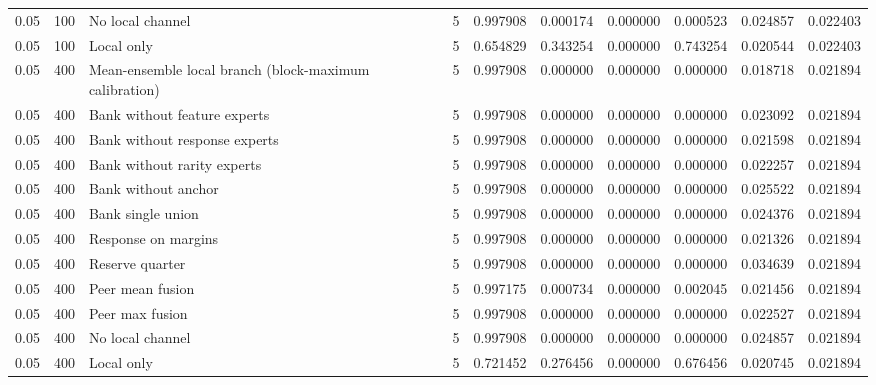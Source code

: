 \begin{tabular}{llllllllll}
0.05 & 100 & No local channel & 5 & 0.997908 & 0.000174 & 0.000000 & 0.000523 & 0.024857 & 0.022403 \\
0.05 & 100 & Local only & 5 & 0.654829 & 0.343254 & 0.000000 & 0.743254 & 0.020544 & 0.022403 \\
0.05 & 400 & Mean-ensemble local branch (block-maximum calibration) & 5 & 0.997908 & 0.000000 & 0.000000 & 0.000000 & 0.018718 & 0.021894 \\
0.05 & 400 & Bank without feature experts & 5 & 0.997908 & 0.000000 & 0.000000 & 0.000000 & 0.023092 & 0.021894 \\
0.05 & 400 & Bank without response experts & 5 & 0.997908 & 0.000000 & 0.000000 & 0.000000 & 0.021598 & 0.021894 \\
0.05 & 400 & Bank without rarity experts & 5 & 0.997908 & 0.000000 & 0.000000 & 0.000000 & 0.022257 & 0.021894 \\
0.05 & 400 & Bank without anchor & 5 & 0.997908 & 0.000000 & 0.000000 & 0.000000 & 0.025522 & 0.021894 \\
0.05 & 400 & Bank single union & 5 & 0.997908 & 0.000000 & 0.000000 & 0.000000 & 0.024376 & 0.021894 \\
0.05 & 400 & Response on margins & 5 & 0.997908 & 0.000000 & 0.000000 & 0.000000 & 0.021326 & 0.021894 \\
0.05 & 400 & Reserve quarter & 5 & 0.997908 & 0.000000 & 0.000000 & 0.000000 & 0.034639 & 0.021894 \\
0.05 & 400 & Peer mean fusion & 5 & 0.997175 & 0.000734 & 0.000000 & 0.002045 & 0.021456 & 0.021894 \\
0.05 & 400 & Peer max fusion & 5 & 0.997908 & 0.000000 & 0.000000 & 0.000000 & 0.022527 & 0.021894 \\
0.05 & 400 & No local channel & 5 & 0.997908 & 0.000000 & 0.000000 & 0.000000 & 0.024857 & 0.021894 \\
0.05 & 400 & Local only & 5 & 0.721452 & 0.276456 & 0.000000 & 0.676456 & 0.020745 & 0.021894 \\
\bottomrule
\end{tabular}
